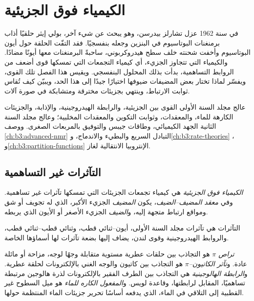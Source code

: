 \chapter{الكيمياء فوق الجزيئية}\label{ch:b3:supramolecular}

في سنة 1962 عزل تشارلز بيدرسن، وهو يبحث عن شيء آخر، بولي إيثر
حلقيًا أذاب برمنغنات البوتاسيوم في البنزين وجعله
بنفسجيًا. فقد التفّت الحلقة حول أيون البوتاسيوم وأخفت
شحنته خلف سطح هيدروكربوني، ساحبةً البرمنغنات معها أيونًا
مضادًا. والكيمياء التي تتجاوز الجزيء، أي كيمياء التجمعات التي تمسكها
قوى أضعف من الروابط التساهمية، بدأت بذلك المحلول البنفسجي.
ويقيس هذا الفصل تلك القوى، ويفسّر لماذا تختار بعض المضيفات ضيوفها
اختيارًا جيدًا إلى هذا الحد، ويبيّن كيف تُقاس ثوابت الارتباط، وينتهي بجزيئات
مخترقة ومتشابكة في صورة آلات.

\begin{recall}
عالج مجلد السنة الأولى القوى بين الجزيئية، والرابطة الهيدروجينية، والإذابة،
والجزيئات الكارهة للماء، والمعقدات، وثوابت التكوين والمعقدات المخلبية؛ وعالج مجلد السنة الثانية
الجهد الكيميائي، وطاقات جيبس والتوفيق بالمربعات الصغرى.
ووصف \cref{ch:b3:advanced-nmr} التبادل السريع والبطيء والاندماج،
و\cref{ch:b3:rate-theories} ، 
و\cref{ch:b3:partition-functions} الإنتروبيا الانتقالية لغاز.
\end{recall}

\section{التآثرات غير التساهمية}

\begin{definition}\label{def:b3:supramolecular:supramolecular}
\emph{الكيمياء فوق الجزيئية} هي كيمياء
تجمعات الجزيئات التي تمسكها تآثرات غير تساهمية. وفي
\emph{معقد المضيف--الضيف}، يكون \emph{المضيف}
الجزيء الأكبر، الذي له تجويف أو شق ومواقع ارتباط متجهة
إليه، و\emph{الضيف} الجزيء الأصغر أو الأيون الذي يربطه.
\end{definition}

التآثرات هي تآثرات مجلد السنة الأولى، أيون--ثنائي قطب، وثنائي قطب--ثنائي قطب،
والروابط الهيدروجينية وقوى لندن، يضاف إليها بضعة تآثرات لها أسماؤها الخاصة.

\begin{definition}\label{def:b3:supramolecular:interactions}
\emph{تراص $\pi$} هو التجاذب بين حلقات عطرية مستوية
متقابلة وجهًا لوجه، مزاحة أو مائلة عادة. و\emph{تآثر الكاتيون--$\pi$}
هو التجاذب بين كاتيون 
والوجه الغني بالإلكترونات لحلقة عطرية. و\emph{الرابطة الهالوجينية}
هي التجاذب بين الطرف الفقير بالإلكترونات لذرة هالوجين مرتبطة
تساهميًا، المقابل لرابطتها، وقاعدة لويس. و\emph{المفعول الكاره
للماء} هو ميل السطوح غير القطبية إلى التلاقي
في الماء، الذي يدفعه أساسًا تحرير جزيئات الماء المنتظمة
حولها.
\end{definition}

